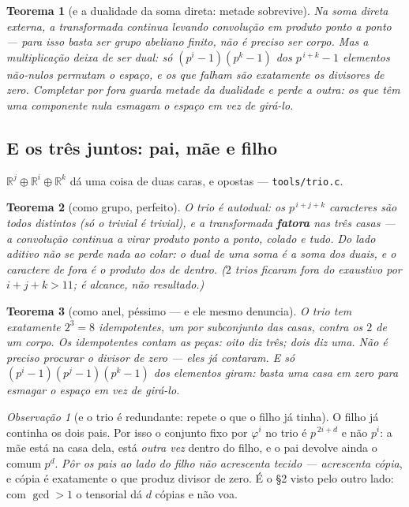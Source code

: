 \documentclass[11pt]{article}
\newcommand{\code}[1]{\texttt{\small #1}}
\newcommand{\R}{\mathbb R}
\theoremstyle{plain}
\newtheorem{teorema}{Teorema}
\theoremstyle{remark}
\newtheorem{obs}{Observação}
\begin{document}
\begin{teorema}[e a dualidade da soma direta: metade sobrevive]
Na soma direta externa, a transformada \emph{continua} levando convolução em produto ponto a ponto
--- para isso basta ser grupo abeliano finito, não é preciso ser corpo. Mas a multiplicação deixa de
ser dual: só $(p^i-1)(p^k-1)$ dos $p^{\,i+k}-1$ elementos não-nulos permutam o espaço, e os que
falham são exatamente os divisores de zero. \emph{Completar por fora guarda metade da dualidade e
perde a outra}: os que têm uma componente nula esmagam o espaço em vez de girá-lo.
\end{teorema}

\subsection*{E os três juntos: pai, mãe e filho}

$\R^j\oplus\R^i\oplus\R^k$ dá uma coisa de duas caras, e opostas --- \code{tools/trio.c}.

\begin{teorema}[como grupo, perfeito]
O trio é autodual: os $p^{\,i+j+k}$ caracteres são todos distintos (só o trivial é trivial), e a
transformada \textbf{fatora} nas três casas --- a convolução continua a virar produto ponto a ponto,
colado e tudo. \emph{Do lado aditivo não se perde nada ao colar}: o dual de uma soma é a soma dos
duais, e o caractere de fora é o produto dos de dentro. ($2$ trios ficaram fora do exaustivo por
$i+j+k>11$; é alcance, não resultado.)
\end{teorema}

\begin{teorema}[como anel, péssimo --- e ele mesmo denuncia]
O trio tem exatamente $2^3=8$ idempotentes, um por subconjunto das casas, contra os $2$ de um corpo.
\emph{Os idempotentes contam as peças}: oito diz três; dois diz uma. Não é preciso procurar o divisor
de zero --- eles já contaram. E só $(p^i-1)(p^j-1)(p^k-1)$ dos elementos giram: basta \emph{uma} casa
em zero para esmagar o espaço em vez de girá-lo.
\end{teorema}

\begin{obs}[e o trio é redundante: repete o que o filho já tinha]
O filho já continha os dois pais. Por isso o conjunto fixo por $\varphi^i$ no trio é $p^{\,2i+d}$ e
não $p^i$: a mãe está na casa dela, está \emph{outra vez} dentro do filho, e o pai devolve ainda o
comum $p^d$. \emph{Pôr os pais ao lado do filho não acrescenta tecido --- acrescenta cópia}, e cópia é
exatamente o que produz divisor de zero. É o \S2 visto pelo outro lado: com $\gcd>1$ o tensorial dá
$d$ cópias e não voa.
\end{obs}
\end{document}
